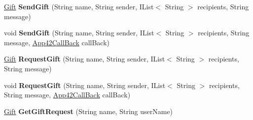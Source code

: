 \begin{DoxyCompactItemize}
\item 
\hypertarget{classcom_1_1shephertz_1_1app42_1_1paas_1_1sdk_1_1csharp_1_1gift_1_1_gift_service_a75f7647cd339b33a8078b793e0267e30}{\hyperlink{classcom_1_1shephertz_1_1app42_1_1paas_1_1sdk_1_1csharp_1_1gift_1_1_gift}{Gift} {\bfseries Send\+Gift} (String name, String sender, I\+List$<$ String $>$ recipients, String message)}\label{classcom_1_1shephertz_1_1app42_1_1paas_1_1sdk_1_1csharp_1_1gift_1_1_gift_service_a75f7647cd339b33a8078b793e0267e30}

\item 
\hypertarget{classcom_1_1shephertz_1_1app42_1_1paas_1_1sdk_1_1csharp_1_1gift_1_1_gift_service_a7bae91898e7c502ca8525da6ccdf3f2f}{void {\bfseries Send\+Gift} (String name, String sender, I\+List$<$ String $>$ recipients, String message, \hyperlink{interfacecom_1_1shephertz_1_1app42_1_1paas_1_1sdk_1_1csharp_1_1_app42_call_back}{App42\+Call\+Back} call\+Back)}\label{classcom_1_1shephertz_1_1app42_1_1paas_1_1sdk_1_1csharp_1_1gift_1_1_gift_service_a7bae91898e7c502ca8525da6ccdf3f2f}

\item 
\hypertarget{classcom_1_1shephertz_1_1app42_1_1paas_1_1sdk_1_1csharp_1_1gift_1_1_gift_service_a150f89e1d98e066f05904cb82b975f63}{\hyperlink{classcom_1_1shephertz_1_1app42_1_1paas_1_1sdk_1_1csharp_1_1gift_1_1_gift}{Gift} {\bfseries Request\+Gift} (String name, String sender, I\+List$<$ String $>$ recipients, String message)}\label{classcom_1_1shephertz_1_1app42_1_1paas_1_1sdk_1_1csharp_1_1gift_1_1_gift_service_a150f89e1d98e066f05904cb82b975f63}

\item 
\hypertarget{classcom_1_1shephertz_1_1app42_1_1paas_1_1sdk_1_1csharp_1_1gift_1_1_gift_service_abb070abdabbacac66bfbb7394e21e6e0}{void {\bfseries Request\+Gift} (String name, String sender, I\+List$<$ String $>$ recipients, String message, \hyperlink{interfacecom_1_1shephertz_1_1app42_1_1paas_1_1sdk_1_1csharp_1_1_app42_call_back}{App42\+Call\+Back} call\+Back)}\label{classcom_1_1shephertz_1_1app42_1_1paas_1_1sdk_1_1csharp_1_1gift_1_1_gift_service_abb070abdabbacac66bfbb7394e21e6e0}

\item 
\hypertarget{classcom_1_1shephertz_1_1app42_1_1paas_1_1sdk_1_1csharp_1_1gift_1_1_gift_service_ac2067c0ec48e0ddadd16422f0526c53f}{\hyperlink{classcom_1_1shephertz_1_1app42_1_1paas_1_1sdk_1_1csharp_1_1gift_1_1_gift}{Gift} {\bfseries Get\+Gift\+Request} (String name, String user\+Name)}\label{classcom_1_1shephertz_1_1app42_1_1paas_1_1sdk_1_1csharp_1_1gift_1_1_gift_service_ac2067c0ec48e0ddadd16422f0526c53f}


\end{DoxyCompactItemize}
